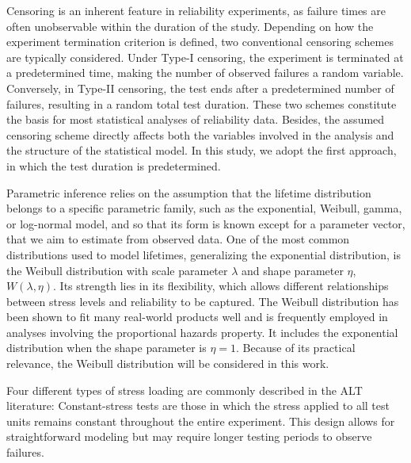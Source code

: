 \documentclass{article}
\begin{document}
Censoring is an inherent feature in reliability experiments, as failure times are often unobservable within the duration of the study. Depending on how the experiment termination criterion is defined, two conventional censoring schemes are typically considered. Under Type-I censoring, the experiment is terminated at a predetermined time, making the number of observed failures a random variable. Conversely, in Type-II censoring, the test ends after a predetermined number of failures, resulting in a random total test duration. These two schemes constitute the basis for most statistical analyses of reliability data. 
Besides, the assumed censoring scheme directly affects both the variables involved in the analysis and the structure of the statistical model. In this study, we adopt the first approach, in which the test duration is predetermined.

Parametric inference relies on the assumption that the lifetime distribution belongs to a specific parametric family, such as the exponential, Weibull, gamma, or log-normal model, and so that its form is known except for a parameter vector, that we aim to estimate from observed data.
One of the most common distributions used to model lifetimes, generalizing the exponential distribution, is the Weibull distribution with scale parameter $\lambda$ and shape parameter $\eta$, $W(\lambda, \eta)$. Its strength lies in its flexibility, which allows different relationships between stress levels and reliability to be captured. The Weibull distribution has been shown to fit many real-world products well and is frequently employed in analyses involving the proportional hazards property. It includes the exponential distribution when the shape parameter is $\eta=1.$ Because of its practical relevance, the Weibull distribution will be considered in this work.

Four different types of stress loading are commonly described in the ALT literature: Constant-stress tests are those in which the stress applied to all test units remains constant throughout the entire experiment. This design allows for straightforward modeling but may require longer testing periods to observe failures.
\end{document}
